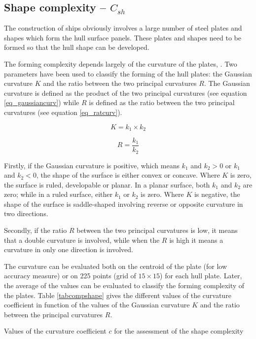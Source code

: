 \subsection{Shape complexity -- $C_{sh}$}
The construction of ships obviously involves a large number of steel plates and shapes which form the hull surface panels. These plates and shapes need to be formed so that the hull shape can be developed.


The forming complexity depends largely of the curvature of the plates, \cite{parsons1999scalar}. Two parameters have been used to classify the forming of the hull plates: the Gaussian curvature $K$ and the ratio between the two principal curvatures $R$. The Gaussian curvature is defined as the product of the two principal curvatures (see equation \ref{eq_gaussiancurv}) while $R$ is defined as the ratio between the two principal curvatures (see equation \ref{eq_ratcurv}).
	
\begin{equation}
\label{eq_gaussiancurv}
K = k_1 \times k_2
\end{equation}
	
\begin{equation}
\label{eq_ratcurv}
R = \frac{k_1}{k_2}
\end{equation}
	
Firstly, if the Gaussian curvature is positive, which means $k_1$ and $k_2 > 0$ or $k_1$ and $k_2 < 0$, the shape of the surface is either convex or concave. Where $K$ is zero, the surface is ruled, developable or planar. In a planar surface, both $k_1$ and $k_2$ are zero; while in a ruled surface, either $k_1$ or $k_2$ is zero. Where $K$ is negative, the shape of the surface is saddle-shaped involving reverse or opposite curvature in two directions.


Secondly, if the ratio $R$ between the two principal curvatures is low, it means that a double curvature is involved, while when the $R$ is high it means a curvature in only one direction is involved.


The curvature can be evaluated both on the centroid of the plate (for low accuracy measure) or on 225 points (grid of $15 \times 15$) for each hull plate. Later, the average of the values can be evaluated to classify the forming complexity of the plates. Table \ref{tabcompshape} gives the different values of the curvature coefficient in function of the values of the Gaussian curvature $K$ and the ratio between the principal curvatures $R$.


\begin{table}
\caption{Values of the curvature coefficient $c$ for the assessment of the shape complexity}
\label{tabcompshape}
\begin{center}

\end{center}
\end{table}


